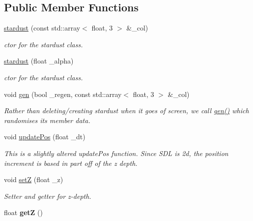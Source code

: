 \subsection*{Public Member Functions}
\begin{DoxyCompactItemize}
\item 
\hyperlink{classstardust_a4d48ae45d2e44771d4d26bab9c43b079}{stardust} (const std\-::array$<$ float, 3 $>$ \&\-\_\-col)
\begin{DoxyCompactList}\small\item\em ctor for the stardust class. \end{DoxyCompactList}\item 
\hyperlink{classstardust_a7258eecfcab3503db967f9791afef7f4}{stardust} (float \-\_\-alpha)
\begin{DoxyCompactList}\small\item\em ctor for the stardust class. \end{DoxyCompactList}\item 
void \hyperlink{classstardust_a6c3121d6ef68b5d39ef2cafeb88d8c46}{gen} (bool \-\_\-regen, const std\-::array$<$ float, 3 $>$ \&\-\_\-col)
\begin{DoxyCompactList}\small\item\em Rather than deleting/creating stardust when it goes of screen, we call \hyperlink{classstardust_a6c3121d6ef68b5d39ef2cafeb88d8c46}{gen()} which randomises its member data. \end{DoxyCompactList}\item 
void \hyperlink{classstardust_ac7d44d75f6f9f12b1c75fc17ad543c38}{update\-Pos} (float \-\_\-dt)
\begin{DoxyCompactList}\small\item\em This is a slightly altered update\-Pos function. Since S\-D\-L is 2d, the position increment is based in part off of the z depth. \end{DoxyCompactList}\item 
\hypertarget{classstardust_a5e74804e887f4d73304eb010b572afa3}{void \hyperlink{classstardust_a5e74804e887f4d73304eb010b572afa3}{set\-Z} (float \-\_\-z)}\label{classstardust_a5e74804e887f4d73304eb010b572afa3}

\begin{DoxyCompactList}\small\item\em Setter and getter for z-\/depth. \end{DoxyCompactList}\item 
\hypertarget{classstardust_a99e985c2828dd44f73b8b2043d6f2d75}{float {\bfseries get\-Z} ()}\label{classstardust_a99e985c2828dd44f73b8b2043d6f2d75}


\end{DoxyCompactItemize}
